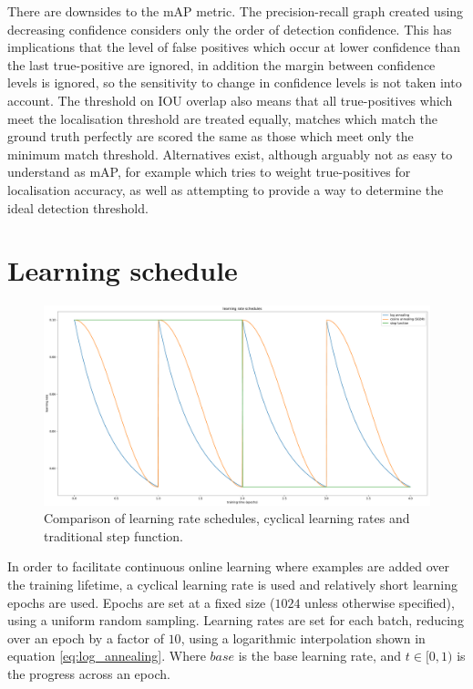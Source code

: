 There are downsides to the \gls{mAP} metric. The precision-recall graph created using decreasing confidence considers only the order of detection confidence. This has implications that the level of false positives which occur at lower confidence than the last true-positive are ignored, in addition the margin between confidence levels is ignored, so the sensitivity to change in confidence levels is not taken into account. The threshold on \gls{IOU} overlap also means that all true-positives which meet the localisation threshold are treated equally, matches which match the ground truth perfectly are scored the same as those which meet only the minimum match threshold. Alternatives exist, although arguably not as easy to understand as \gls{mAP}, for example \cite{Oksuz2018} which tries to weight true-positives for localisation accuracy, as well as attempting to provide a way to determine the ideal detection threshold.



\section {Learning schedule}
\label{sec:schedule}

\begin{figure}[h]
  \centering
  \includegraphics[width=1.0\linewidth]{charts/training/lr_schedules.pdf}
  \caption{Comparison of learning rate schedules, cyclical learning rates and traditional step function.  }  
  \label{fig:lr_schedule}
\end{figure}

In order to facilitate continuous online learning where examples are added over the training lifetime, a cyclical learning rate is used and relatively short learning epochs are used. Epochs are set at a fixed size ($1024$ unless otherwise specified), using a uniform random sampling. Learning rates are set for each batch, reducing over an epoch by a factor of $10$, using a logarithmic interpolation shown in equation \ref{eq:log_annealing}. Where $base$ is the base learning rate, and $ t \in [0, 1) $ is the progress across an epoch.


